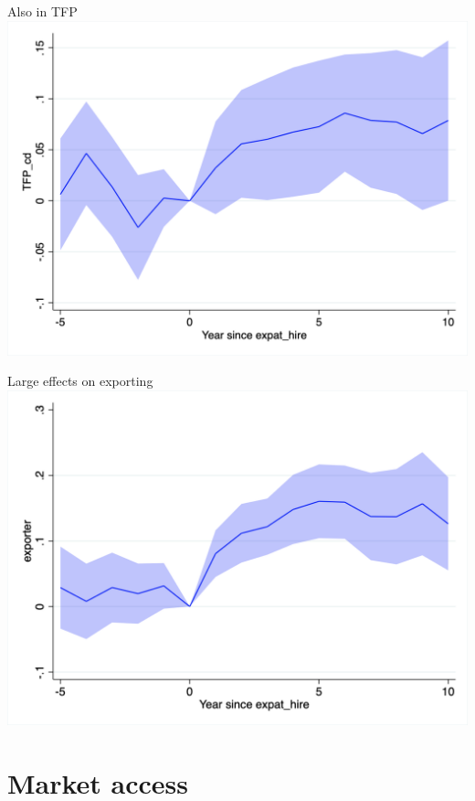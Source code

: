 \documentclass[
  ignorenonframetext,
  aspectratio=43,
]{beamer}
\begin{document}
\begin{frame}{Also in TFP}
\protect\hypertarget{also-in-tfp-1}{}
\includegraphics{figure/event_study/expat_hire_TFP_cd.png}
\end{frame}

\begin{frame}{Large effects on exporting}
\protect\hypertarget{large-effects-on-exporting}{}
\includegraphics{figure/event_study/expat_hire_exporter.png}
\end{frame}

\hypertarget{market-access}{%
\section{Market access}\label{market-access}}
\end{document}
